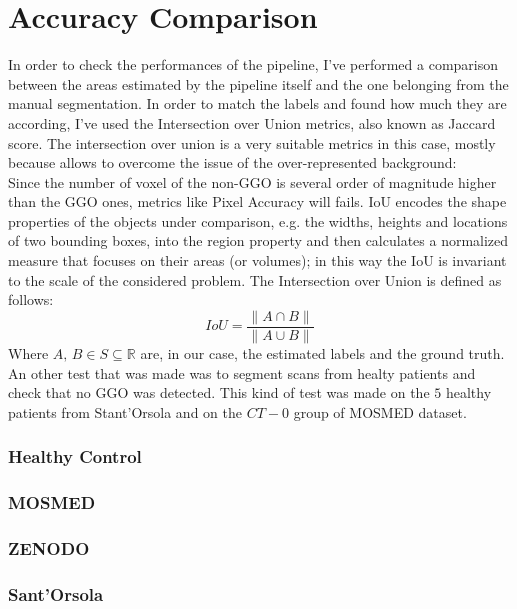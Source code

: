 \documentclass{standalone}
\begin{document}
	\section{Accuracy Comparison}	
	
	In order to check the performances of the pipeline, I've performed a comparison between the areas estimated by the pipeline itself and the one belonging from the manual segmentation. In order to match the labels and found how much they are according, I've used the Intersection over Union metrics, also known as Jaccard score. The intersection over union is a very suitable metrics in this case, mostly because allows  to overcome the issue of the over-represented background:\\
	Since the number of voxel of the non-GGO is several order of magnitude higher than the GGO ones, metrics like Pixel Accuracy will fails.
	IoU encodes the shape properties of the objects under comparison, e.g. the widths, heights and locations of two bounding boxes, into the region property and then calculates a normalized measure that focuses on their areas (or volumes); in this way the IoU is invariant to the scale of the considered problem. 
	The Intersection over Union is defined as follows: 
	\begin{equation*}
		IoU = \frac{\|A \cap B \|}{\| A \cup B \|}
	\end{equation*}
	Where $A,\, B\in S\subseteq\mathbb{R}$ are, in our case, the estimated labels and the ground truth.\\

	An other test that was made was to segment scans from healty patients and check that no GGO was detected. This kind of test was made on the $5$ healthy patients from Stant'Orsola and on the $CT-0$ group of MOSMED dataset.\\
	
	\subsubsection*{Healthy Control}
	
	\subsubsection*{MOSMED}
	
	\subsubsection*{ZENODO}
	
	\subsubsection*{Sant'Orsola}
\end{document}
